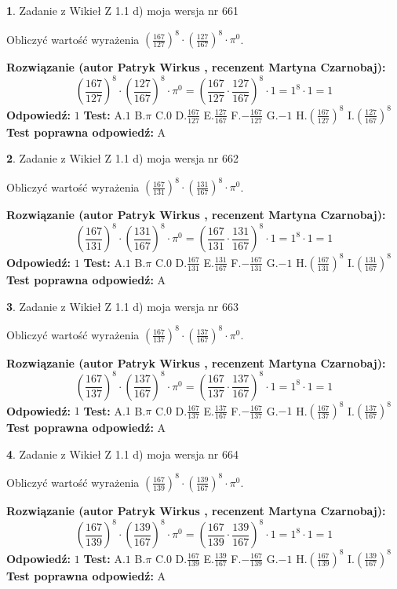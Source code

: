 \documentclass[12pt, a4paper]{article}
\theoremstyle{definition} %
\newtheorem{zad}{}
\newcommand{\zadStart}[1]{\begin{zad}#1\newline}
\newcommand{\zadStop}{\end{zad}}
\newcommand{\rozwStart}[2]{\noindent \textbf{Rozwiązanie (autor #1 , recenzent #2): }\newline}
\newcommand{\rozwStop}{\newline}
\newcommand{\odpStart}{\noindent \textbf{Odpowiedź:}\newline}
\newcommand{\odpStop}{\newline}
\newcommand{\testStart}{\noindent \textbf{Test:}\newline}
\newcommand{\testStop}{\newline}
\newcommand{\kluczStart}{\noindent \textbf{Test poprawna odpowiedź:}\newline}
\newcommand{\kluczStop}{\newline}
\begin{document}
\zadStart{Zadanie z Wikieł Z 1.1 d) moja wersja nr 661}

Obliczyć wartość wyrażenia $(\frac{167}{127})^{8} \cdot (\frac{127}{167})^{8} \cdot \pi^{0}$.
\zadStop
\rozwStart{Patryk Wirkus}{Martyna Czarnobaj}
$$(\frac{167}{127})^{8} \cdot (\frac{127}{167})^{8} \cdot \pi^{0} = (\frac{167}{127} \cdot \frac{127}{167})^{8} \cdot 1 = 1^{8} \cdot 1 = 1$$
\rozwStop
\odpStart
$1$
\odpStop
\testStart
A.$1$ B.$\pi$ C.$0$ D.$\frac{167}{127}$ E.$\frac{127}{167}$
F.$-\frac{167}{127}$ G.$-1$
H.$(\frac{167}{127})^{8}$
I.$(\frac{127}{167})^{8}$
\testStop
\kluczStart
A
\kluczStop



\zadStart{Zadanie z Wikieł Z 1.1 d) moja wersja nr 662}

Obliczyć wartość wyrażenia $(\frac{167}{131})^{8} \cdot (\frac{131}{167})^{8} \cdot \pi^{0}$.
\zadStop
\rozwStart{Patryk Wirkus}{Martyna Czarnobaj}
$$(\frac{167}{131})^{8} \cdot (\frac{131}{167})^{8} \cdot \pi^{0} = (\frac{167}{131} \cdot \frac{131}{167})^{8} \cdot 1 = 1^{8} \cdot 1 = 1$$
\rozwStop
\odpStart
$1$
\odpStop
\testStart
A.$1$ B.$\pi$ C.$0$ D.$\frac{167}{131}$ E.$\frac{131}{167}$
F.$-\frac{167}{131}$ G.$-1$
H.$(\frac{167}{131})^{8}$
I.$(\frac{131}{167})^{8}$
\testStop
\kluczStart
A
\kluczStop



\zadStart{Zadanie z Wikieł Z 1.1 d) moja wersja nr 663}

Obliczyć wartość wyrażenia $(\frac{167}{137})^{8} \cdot (\frac{137}{167})^{8} \cdot \pi^{0}$.
\zadStop
\rozwStart{Patryk Wirkus}{Martyna Czarnobaj}
$$(\frac{167}{137})^{8} \cdot (\frac{137}{167})^{8} \cdot \pi^{0} = (\frac{167}{137} \cdot \frac{137}{167})^{8} \cdot 1 = 1^{8} \cdot 1 = 1$$
\rozwStop
\odpStart
$1$
\odpStop
\testStart
A.$1$ B.$\pi$ C.$0$ D.$\frac{167}{137}$ E.$\frac{137}{167}$
F.$-\frac{167}{137}$ G.$-1$
H.$(\frac{167}{137})^{8}$
I.$(\frac{137}{167})^{8}$
\testStop
\kluczStart
A
\kluczStop



\zadStart{Zadanie z Wikieł Z 1.1 d) moja wersja nr 664}

Obliczyć wartość wyrażenia $(\frac{167}{139})^{8} \cdot (\frac{139}{167})^{8} \cdot \pi^{0}$.
\zadStop
\rozwStart{Patryk Wirkus}{Martyna Czarnobaj}
$$(\frac{167}{139})^{8} \cdot (\frac{139}{167})^{8} \cdot \pi^{0} = (\frac{167}{139} \cdot \frac{139}{167})^{8} \cdot 1 = 1^{8} \cdot 1 = 1$$
\rozwStop
\odpStart
$1$
\odpStop
\testStart
A.$1$ B.$\pi$ C.$0$ D.$\frac{167}{139}$ E.$\frac{139}{167}$
F.$-\frac{167}{139}$ G.$-1$
H.$(\frac{167}{139})^{8}$
I.$(\frac{139}{167})^{8}$
\testStop
\kluczStart
A
\kluczStop
\end{document}
